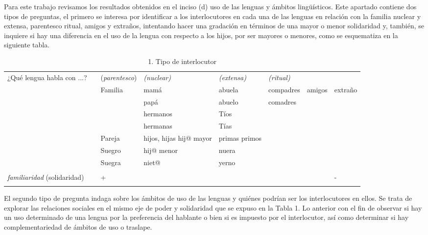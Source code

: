 \documentclass[output=paper]{../langscibook}
\begin{document}
Para este trabajo revisamos los resultados obtenidos en el inciso (d) uso de las lenguas y ámbitos lingüísticos. Este apartado contiene dos tipos de preguntas, el primero se interesa por identificar a los interlocutores en cada una de las lenguas en relación con la familia nuclear y extensa, parentesco ritual, amigos y extraños, intentando hacer una gradación en términos de una mayor o menor solidaridad y, también, se inquiere si hay una diferencia en el uso de la lengua con respecto a los hijos, por ser mayores o menores, como se esquematiza en la siguiente tabla.

\begin{table}
\caption{\label{tab:guerrero}1. Tipo de interlocutor \citep[305]{Guerrero2016}}


\begin{tabularx}{\textwidth}{XXXXXXXX}

\lsptoprule
{¿Qué lengua habla con ...?} & \multicolumn{1}{c}{} & {(\textit{parentesco})} & {\textit{(nuclear)}} & {\textit{(extensa)}} & {\textit{(ritual)}} &  & \multicolumn{1}{c}{}\\
&  & {Familia} & {mamá} & {abuela} & {compadres} & {amigos} & {extraño}\\
&  &  & {papá} & {abuelo} & {comadres} &  & \\
&  &  & {hermanos} & {Tíos} &  &  & \\
&  &  & {hermanas} & {Tías} &  &  & \\
&  & {Pareja} & {hijos, hijas hij@ mayor} & {primas primos} &  &  & \\
&  & {Suegro} & {hij@ menor} & {nuera} &  &  & \\
&  & {Suegra} & {niet@} & {yerno} &  &  & \\
&  &  &  &  &  &  & \\
{\textit{familiaridad} (solidaridad)} &  & {+} &  &  &  &  & {{}-}\\
\lspbottomrule
\end{tabularx}
\end{table}

El segundo tipo de pregunta indaga sobre los ámbitos de uso de las lenguas y quiénes podrían ser los interlocutores en ellos. Se trata de explorar las relaciones sociales en el mismo eje de poder y solidaridad que se expuso en la Tabla 1. Lo anterior con el fin de observar si hay un uso determinado de una lengua por la preferencia del hablante o bien si es impuesto por el interlocutor, así como determinar si hay complementariedad de ámbitos de uso o traslape.
\end{document}
